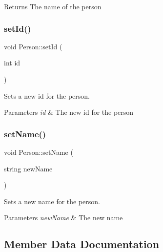 \begin{DoxyReturn}{Returns}
The name of the person 
\end{DoxyReturn}
\mbox{\label{class_person_ae08bf551df2688cd866c41b5d9cb8f1c}} 
\subsubsection{\texorpdfstring{set\+Id()}{setId()}}
{\footnotesize\ttfamily void Person\+::set\+Id (\begin{DoxyParamCaption}\item[{int}]{id }\end{DoxyParamCaption})}



Sets a new id for the person. 


\begin{DoxyParams}{Parameters}
{\em id} & The new id for the person \\
\hline
\end{DoxyParams}
\mbox{\label{class_person_a0f6294ead76bdac161bc71854799b09c}} 
\subsubsection{\texorpdfstring{set\+Name()}{setName()}}
{\footnotesize\ttfamily void Person\+::set\+Name (\begin{DoxyParamCaption}\item[{string}]{new\+Name }\end{DoxyParamCaption})}



Sets a new name for the person. 


\begin{DoxyParams}{Parameters}
{\em new\+Name} & The new name \\
\hline
\end{DoxyParams}


\subsection{Member Data Documentation}
\mbox{\label{class_person_aec48a92f614a854ff380a15eb8e2f479}} 
